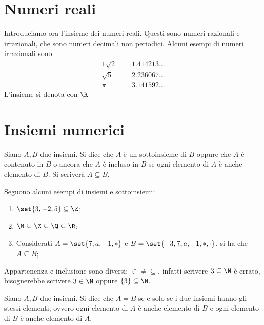 \section{Numeri reali}
Introduciamo ora l'insieme dei numeri reali. Questi sono numeri razionali e irrazionali, che sono numeri decimali non periodici. Alcuni esempi di numeri irrazionali sono
\begin{alignat*}{1}
        \sqrt{2} &= 1.414213 \dotsc \\
        \sqrt{5} &= 2.236067 \dotsc \\
             \pi &= 3.141592 \dotsc
\end{alignat*}
L'insieme si denota con \(\R\)


\section{Insiemi numerici}\label{sec:insiemi_numerici}
\begin{definition}\label{def:sottoinsieme_improprio}
    Siano \(A,B\) due insiemi. Si dice che \(A\) è un sottoinsieme di \(B\) oppure che \(A\) è contenuto in \(B\) o ancora che \(A\) è incluso in \(B\) se ogni elemento di \(A\) è anche elemento di \(B\). Si scriverà \(A \subseteq B\).
\end{definition}

\begin{examples}
    Seguono alcuni esempi di insiemi e sottoinsiemi:
        \begin{enumerate}
            \item \(\set{3, -2, 5} \subseteq \Z\);
            \item \(\N \subseteq \Z \subseteq \Q \subseteq \R\);
            \item Considerati \(A = \set{7, a, -1, *}\) e \(B = \set{-3, 7, a, -1, *, \cdot}\), si ha che \(A \subseteq B\);
        \end{enumerate}
\end{examples}

\begin{remark}
    Appartenenza e inclusione sono diversi: \(\in \mathop{\neq} \subseteq\), infatti scrivere \(3 \subseteq \N\) è errato, bisognerebbe scrivere \(3 \in \N\) oppure \(\{3\} \subseteq \N\).
\end{remark}


\begin{definition}\label{def:insiemi_uguali}
    Siano \(A,B\) due insiemi. Si dice che \(A = B\) se e solo se i due insiemi hanno gli stessi elementi, ovvero ogni elemento di \(A\) è anche elemento di \(B\) e ogni elemento di \(B\) è anche elemento di \(A\). 
\end{definition}

